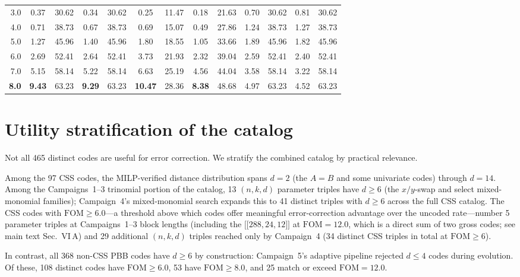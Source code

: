\documentclass[aps,prxquantum,twocolumn,superscriptaddress,nofootinbib]{revtex4-2}
\newcommand{\dblbrk}[1]{\ensuremath{\lbrack\!\lbrack #1 \rbrack\!\rbrack}}
\newcommand{\code}[1]{\dblbrk{#1}}
\newcommand{\FOM}{\ensuremath{\mathrm{FOM}}}
\begin{document}
\begin{table}[t]
\begin{tabular}{r|cc|cc|cc|cc|cc|cc}
3.0 & 0.37 & 30.62 & 0.34 & 30.62 & 0.25 & 11.47 & 0.18 & 21.63 & 0.70 & 30.62 & 0.81 & 30.62 \\
4.0 & 0.71 & 38.73 & 0.67 & 38.73 & 0.69 & 15.07 & 0.49 & 27.86 & 1.24 & 38.73 & 1.27 & 38.73 \\
5.0 & 1.27 & 45.96 & 1.40 & 45.96 & 1.80 & 18.55 & 1.05 & 33.66 & 1.89 & 45.96 & 1.82 & 45.96 \\
6.0 & 2.69 & 52.41 & 2.64 & 52.41 & 3.73 & 21.93 & 2.32 & 39.04 & 2.59 & 52.41 & 2.40 & 52.41 \\
7.0 & 5.15 & 58.14 & 5.22 & 58.14 & 6.63 & 25.19 & 4.56 & 44.04 & 3.58 & 58.14 & 3.22 & 58.14 \\
\textbf{8.0} & \textbf{9.43} & 63.23 & \textbf{9.29} & 63.23 & \textbf{10.47} & 28.36 & \textbf{8.38} & 48.68 & 4.97 & 63.23 & 4.52 & 63.23 \\
\bottomrule
\end{tabular}
\end{table}

\section{Utility stratification of the catalog}
\label{sm:utility}

Not all 465 distinct codes are useful for error correction.
We stratify the combined catalog by practical relevance.

Among the 97 CSS codes, the MILP-verified distance distribution spans $d = 2$ (the $A = B$ and some univariate codes) through $d = 14$.
Among the Campaigns~1--3 trinomial portion of the catalog, 13 $(n, k, d)$ parameter triples have $d \geq 6$ (the $x/y$-swap and select mixed-monomial families); Campaign~4's mixed-monomial search expands this to 41 distinct triples with $d \geq 6$ across the full CSS catalog.
The CSS codes with $\FOM \geq 6.0$---a threshold above which codes offer meaningful error-correction advantage over the uncoded rate---number 5 parameter triples at Campaigns~1--3 block lengths (including the $\code{288,24,12}$ at $\FOM = 12.0$, which is a direct sum of two gross codes; see main text Sec.~VI\,A) and 29 additional $(n,k,d)$ triples reached only by Campaign~4 (34 distinct CSS triples in total at $\FOM \geq 6$).

In contrast, all 368 non-CSS PBB codes have $d \geq 6$ by construction: Campaign~5's adaptive pipeline rejected $d \leq 4$ codes during evolution.
Of these, 108 distinct codes have $\FOM \geq 6.0$, 53 have $\FOM \geq 8.0$, and 25 match or exceed $\FOM = 12.0$.
\end{document}
